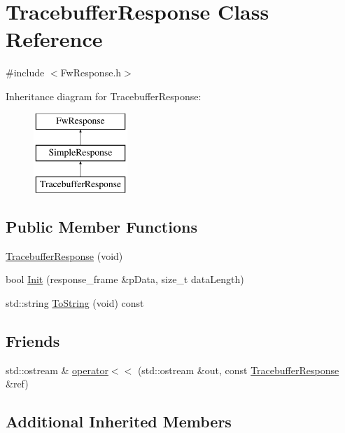 \hypertarget{class_tracebuffer_response}{\section{Tracebuffer\-Response Class Reference}
\label{class_tracebuffer_response}
}


{\ttfamily \#include $<$Fw\-Response.\-h$>$}

Inheritance diagram for Tracebuffer\-Response\-:\begin{figure}[H]
\begin{center}
\leavevmode
\includegraphics[height=3.000000cm]{class_tracebuffer_response}
\end{center}
\end{figure}
\subsection*{Public Member Functions}
\begin{DoxyCompactItemize}
\item 
\hyperlink{class_tracebuffer_response_a94988174d777de8317773333fc5e9d86}{Tracebuffer\-Response} (void)
\item 
bool \hyperlink{class_tracebuffer_response_ab845cfa616b5de2acf9c346d2ae02646}{Init} (response\-\_\-frame \&p\-Data, size\-\_\-t data\-Length)
\item 
std\-::string \hyperlink{class_tracebuffer_response_aa99d3df67d0166806f0b56be29b7f294}{To\-String} (void) const 
\end{DoxyCompactItemize}
\subsection*{Friends}
\begin{DoxyCompactItemize}
\item 
std\-::ostream \& \hyperlink{class_tracebuffer_response_a4ada06f1b6fe35635b6efdbbea164fd8}{operator$<$$<$} (std\-::ostream \&out, const \hyperlink{class_tracebuffer_response}{Tracebuffer\-Response} \&ref)
\end{DoxyCompactItemize}
\subsection*{Additional Inherited Members}


